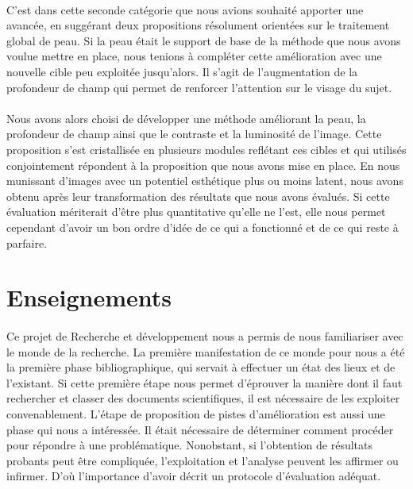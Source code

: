 \documentclass[11pt, french]{report-rd-info}
\begin{document}
\paragraph*{}
C'est dans cette seconde catégorie que nous avions souhaité apporter une avancée, en suggérant deux propositions résolument orientées sur le traitement global de peau. Si la peau était le support de base de la méthode que nous avons voulue mettre en place, nous tenions à compléter cette amélioration avec une nouvelle cible peu exploitée jusqu'alors. Il s'agit de l'augmentation de la profondeur de champ qui permet de renforcer l'attention sur le visage du sujet.
\paragraph*{}
Nous avons alors choisi de développer une méthode améliorant la peau, la profondeur de champ ainsi que le contraste et la luminosité de l'image. Cette proposition s'est cristallisée en plusieurs modules reflétant ces cibles et qui utilisés conjointement répondent à la proposition que nous avons mise en place. En nous munissant d'images avec un potentiel esthétique plus ou moins latent, nous avons obtenu après leur transformation des résultats que nous avons évalués. Si cette évaluation mériterait d'être plus quantitative qu'elle ne l'est, elle nous permet cependant d'avoir un bon ordre d'idée de ce qui a fonctionné et de ce qui reste à parfaire.

\section{Enseignements}
\paragraph*{}
Ce projet de Recherche et développement nous a permis de nous familiariser avec le monde de la recherche. La première manifestation de ce monde pour nous a été la première phase bibliographique, qui servait à effectuer un état des lieux et de l'existant. Si cette première étape nous permet d'éprouver la manière dont il faut rechercher et classer des documents scientifiques, il est nécessaire de les exploiter convenablement. L'étape de proposition de pistes d'amélioration est aussi une phase qui nous a intéressée. Il était nécessaire de déterminer comment procéder pour répondre à une problématique. Nonobstant, si l'obtention de résultats probants peut être compliquée, l'exploitation et l'analyse peuvent les affirmer ou infirmer. D'où l'importance d'avoir décrit un protocole d'évaluation adéquat.
\end{document}

